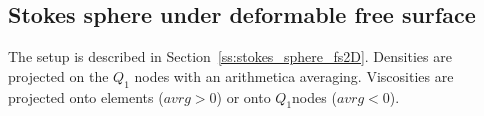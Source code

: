 \subsection*{Stokes sphere under deformable free surface}


The setup is described in Section~\ref{ss:stokes_sphere_fs2D}. 
Densities are projected on the $Q_1$ nodes with an arithmetica averaging. 
Viscosities are projected onto elements ($avrg>0$) or onto $Q_1$nodes ($avrg<0$).






 

